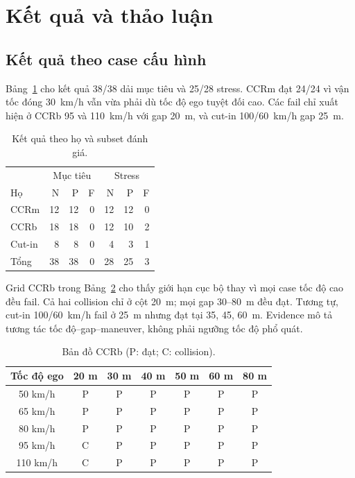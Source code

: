 \documentclass[conference]{IEEEtran}
\begin{document}
\section{Kết quả và thảo luận}
\subsection{Kết quả theo case cấu hình}
Bảng~\ref{tab:results} cho kết quả 38/38 dải mục tiêu và 25/28 stress. CCRm đạt
24/24 vì vận tốc đóng 30~km/h vẫn vừa phải dù tốc độ ego tuyệt đối cao. Các fail
chỉ xuất hiện ở CCRb 95 và 110~km/h với gap 20~m, và cut-in 100/60~km/h gap
25~m.

\begin{table}[t]
\caption{Kết quả theo họ và subset đánh giá.}
\label{tab:results}
\centering
\footnotesize
\begin{tabular}{lrrr|rrr}
\toprule
& \multicolumn{3}{c|}{Mục tiêu} & \multicolumn{3}{c}{Stress} \\
Họ & N & P & F & N & P & F \\
\midrule
CCRm & 12 & 12 & 0 & 12 & 12 & 0 \\
CCRb & 18 & 18 & 0 & 12 & 10 & 2 \\
Cut-in & 8 & 8 & 0 & 4 & 3 & 1 \\
\midrule
Tổng & 38 & 38 & 0 & 28 & 25 & 3 \\
\bottomrule
\end{tabular}
\end{table}

Grid CCRb trong Bảng~\ref{tab:ccrbmap} cho thấy giới hạn cục bộ thay vì mọi case
tốc độ cao đều fail. Cả hai collision chỉ ở cột 20~m; mọi gap 30--80~m đều đạt.
Tương tự, cut-in 100/60~km/h fail ở 25~m nhưng đạt tại 35, 45, 60~m. Evidence mô
tả tương tác tốc độ--gap--maneuver, không phải ngưỡng tốc độ phổ quát.

\begin{table}[t]
\caption{Bản đồ CCRb (P: đạt; C: collision).}
\label{tab:ccrbmap}
\centering
\scriptsize
\begin{tabular}{c*{6}{c}}
\toprule
Tốc độ ego & 20 m & 30 m & 40 m & 50 m & 60 m & 80 m \\
\midrule
50 km/h  & P & P & P & P & P & P \\
65 km/h  & P & P & P & P & P & P \\
80 km/h  & P & P & P & P & P & P \\
95 km/h  & C & P & P & P & P & P \\
110 km/h & C & P & P & P & P & P \\
\bottomrule
\end{tabular}
\end{table}
\end{document}
